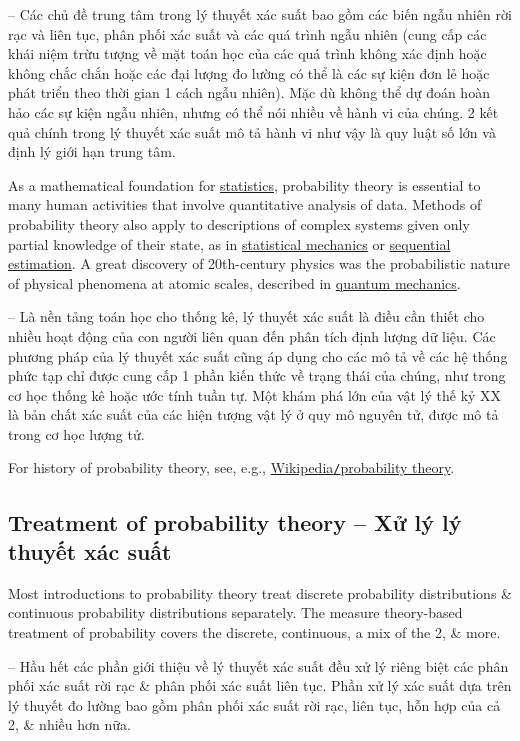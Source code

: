 \documentclass{article}
\begin{document}
-- Các chủ đề trung tâm trong lý thuyết xác suất bao gồm các biến ngẫu nhiên rời rạc và liên tục, phân phối xác suất và các quá trình ngẫu nhiên (cung cấp các khái niệm trừu tượng về mặt toán học của các quá trình không xác định hoặc không chắc chắn hoặc các đại lượng đo lường có thể là các sự kiện đơn lẻ hoặc phát triển theo thời gian 1 cách ngẫu nhiên). Mặc dù không thể dự đoán hoàn hảo các sự kiện ngẫu nhiên, nhưng có thể nói nhiều về hành vi của chúng. 2 kết quả chính trong lý thuyết xác suất mô tả hành vi như vậy là quy luật số lớn và định lý giới hạn trung tâm.

As a mathematical foundation for \href{https://en.wikipedia.org/wiki/Statistics}{statistics}, probability theory is essential to many human activities that involve quantitative analysis of data. Methods of probability theory also apply to descriptions of complex systems given only partial knowledge of their state, as in \href{https://en.wikipedia.org/wiki/Statistical_mechanics}{statistical mechanics} or \href{https://en.wikipedia.org/wiki/Sequential_estimation}{sequential estimation}. A great discovery of 20th-century physics was the probabilistic nature of physical phenomena at atomic scales, described in \href{https://en.wikipedia.org/wiki/Quantum_mechanics}{quantum mechanics}.

-- Là nền tảng toán học cho thống kê, lý thuyết xác suất là điều cần thiết cho nhiều hoạt động của con người liên quan đến phân tích định lượng dữ liệu. Các phương pháp của lý thuyết xác suất cũng áp dụng cho các mô tả về các hệ thống phức tạp chỉ được cung cấp 1 phần kiến thức về trạng thái của chúng, như trong cơ học thống kê hoặc ước tính tuần tự. Một khám phá lớn của vật lý thế kỷ XX là bản chất xác suất của các hiện tượng vật lý ở quy mô nguyên tử, được mô tả trong cơ học lượng tử.

For history of probability theory, see, e.g., \href{https://en.wikipedia.org/wiki/History_of_probability}{Wikipedia{\tt/}probability theory}.

\subsection{Treatment of probability theory -- Xử lý lý thuyết xác suất}
Most introductions to probability theory treat discrete probability distributions \& continuous probability distributions separately. The measure theory-based treatment of probability covers the discrete, continuous, a mix of the 2, \& more.

-- Hầu hết các phần giới thiệu về lý thuyết xác suất đều xử lý riêng biệt các phân phối xác suất rời rạc \& phân phối xác suất liên tục. Phần xử lý xác suất dựa trên lý thuyết đo lường bao gồm phân phối xác suất rời rạc, liên tục, hỗn hợp của cả 2, \& nhiều hơn nữa.
\end{document}

